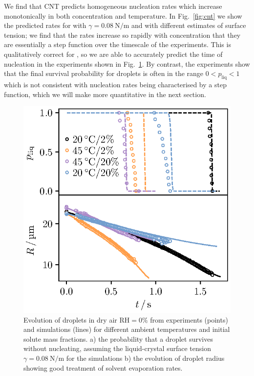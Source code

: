 \documentclass[11pt,twoside]{report}
\begin{document}
We find that CNT predicts homogeneous nucleation rates which increase monotonically in both concentration and temperature.
In Fig.\ \ref{fig:cnt} we show the predicted rates for  with $\gamma=\SI{0.08}{\newton\per\metre}$ and  with different estimates of surface tension; we find that the rates increase so rapidly with concentration that they are essentially a step function over the timescale of the experiments.
This is qualitatively correct for , so we are able to accurately predict the time of nucleation in the experiments shown in Fig.\ \ref{fig:nacl-trajectory}.
By contrast, the experiments show that the final survival probability for  droplets is often in the range $0 < p_\mathrm{liq} < 1$ which is not consistent with nucleation rates being characterised by a step function, which we will make more quantitative in the next section.

\begin{figure}
  \includegraphics[width=0.9\linewidth,outer]{nacl-trajectory}
  \caption[Evolution of  droplets: theory and experiments]{
    Evolution of  droplets in dry air $\mathrm{RH}=0\%$ from experiments (points) and simulations (lines) for different ambient temperatures and initial solute mass fractions.
    a) the probability that a droplet survives without nucleating, assuming the liquid-crystal surface tension $\gamma = \SI{0.08}{\newton\per\metre}$ \cite{DesarnaudJPCL2014} for the simulations
    b) the evolution of droplet radius showing good treatment of solvent evaporation rates.
  }
  \label{fig:nacl-trajectory}
\end{figure}
\end{document}
